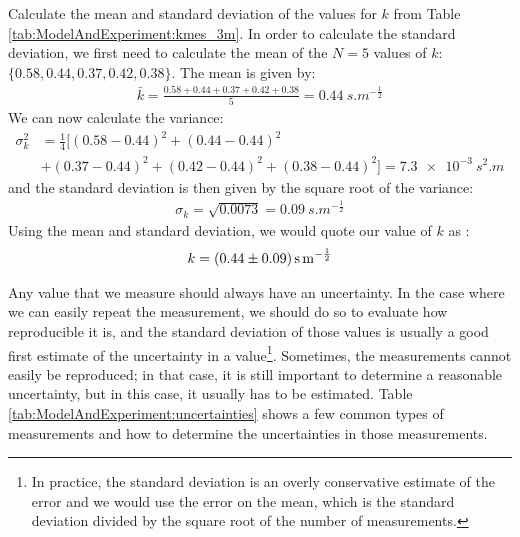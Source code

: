 \begin{example}{Calculate the mean and standard deviation of the values for $k$ from Table \ref{tab:ModelAndExperiment:kmes_3m}.}
\label{ex:modelandexperiment:stdcalc}
In order to calculate the standard deviation, we first need to calculate the mean of the $N=5$ values of $k$: $\{0.58, 0.44, 0.37, 0.42, 0.38 \}$. The mean is given by:
\begin{align*}
\bar k = \frac{0.58 + 0.44 + 0.37 + 0.42 + 0.38}{5}=\SI{0.44}{s.m^{-\frac{1}{2}}}
\end{align*}
We can now calculate the variance:
\begin{align*}
\sigma^2_k &= \frac{1}{4}[(0.58-0.44)^2+(0.44-0.44)^2\\
         &+(0.37-0.44)^2+(0.42-0.44)^2+(0.38-0.44)^2]=\SI{7.3e-3}{s^2.m}
\end{align*}
and the standard deviation is then given by the square root of the variance:
\begin{align*}
\sigma_k=\sqrt{0.0073}=\SI{0.09}{s.m^{-\frac{1}{2}}}
\end{align*}
Using the mean and standard deviation, we would quote our value of $k$ as :
\begin{align*}
k=\SI{0.44 \pm 0.09}{s.m^{-\frac{1}{2}}}
\end{align*}

\end{example}
Any value that we measure should always have an uncertainty. In the case where we can easily repeat the measurement, we should do so to evaluate how reproducible it is, and the standard deviation of those values is usually a good first estimate of the uncertainty in a value\footnote{In practice, the standard deviation is an overly conservative estimate of the error and we would use the error on the mean, which is the standard deviation divided by the square root of the number of measurements.}. Sometimes, the measurements cannot easily be reproduced; in that case, it is still important to determine a reasonable uncertainty, but in this case, it usually has to be estimated. Table \ref{tab:ModelAndExperiment:uncertainties} shows a few common types of measurements and how to determine the uncertainties in those measurements. 

